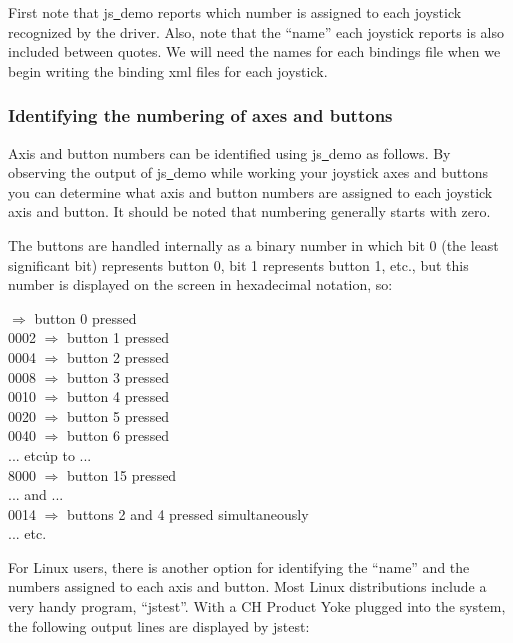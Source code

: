 \noindent
First note that js\underline{~}demo reports which number is assigned to each joystick recognized by the driver.  Also, note that the ``name'' each joystick reports is also included between quotes.  We will need the names for each bindings file when we begin writing the binding xml files for each joystick.

\subsubsection{Identifying the numbering of axes and buttons\label{identifying}}
Axis and button numbers can be identified using js\underline{~}demo as follows. By observing the output of js\underline{~}demo while working your joystick axes and buttons you can determine what axis and button numbers are assigned to each joystick axis and button. It should be noted that numbering generally starts with zero. 

The buttons are handled internally as a binary number in which bit 0 (the least significant bit) represents button 0, bit 1 represents button 1, etc., but this number is displayed on the screen in hexadecimal notation, so:
\medskip

 $\Rightarrow$ button 0 pressed\\
  0002 $\Rightarrow$ button 1 pressed\\
  0004 $\Rightarrow$ button 2 pressed\\
  0008 $\Rightarrow$ button 3 pressed\\
  0010 $\Rightarrow$ button 4 pressed\\
  0020 $\Rightarrow$ button 5 pressed\\
  0040 $\Rightarrow$ button 6 pressed\\
  ... etc\. up to ...\\
  8000 $\Rightarrow$ button 15 pressed\\
  ... and ...\\
  0014 $\Rightarrow$ buttons 2 and 4 pressed simultaneously\\
  ... etc.
  \medskip

For Linux users, there is another option for identifying the ``name'' and the numbers assigned to each axis and button.  Most Linux distributions include a very handy program, ``jstest''.  With a CH Product Yoke plugged into the system, the following output lines are displayed by jstest:
\medskip

